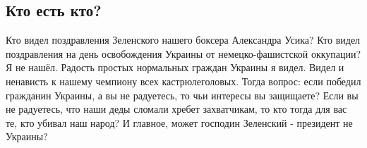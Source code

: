  
 
 

\subsection{Кто есть кто?}


Кто видел поздравления Зеленского нашего боксера Александра Усика? Кто видел
поздравления на день освобождения Украины от немецко-фашистской оккупации? Я не
нашёл. Радость простых нормальных граждан Украины я видел. Видел и ненависть к
нашему чемпиону всех кастрюлеголовых. Тогда вопрос: если победил гражданин
Украины, а вы не радуетесь, то чьи интересы вы защищаете? Если вы не радуетесь,
что наши деды сломали хребет захватчикам, то кто тогда для вас те, кто убивал
наш народ? И главное, может господин Зеленский - президент не Украины?

